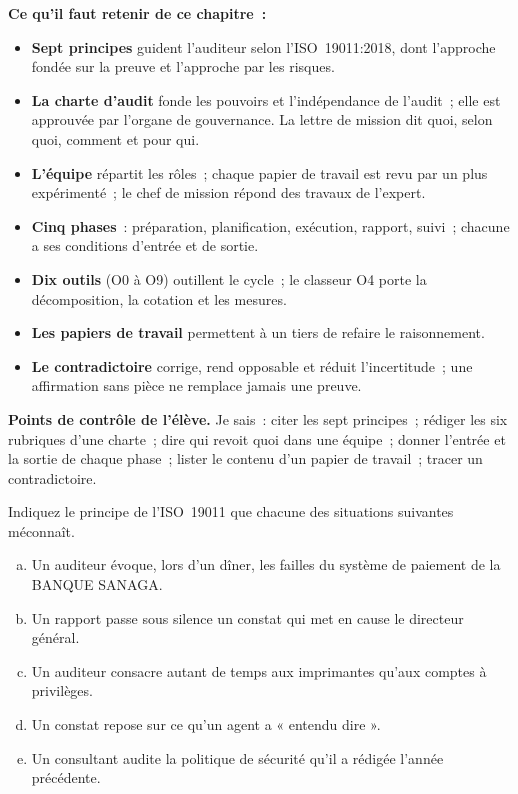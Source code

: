 \begin{boxresume}
\textbf{Ce qu'il faut retenir de ce chapitre~:}
\begin{itemize}
    \item \textbf{Sept principes} guident l'auditeur selon l'ISO~19011:2018,
          dont l'approche fondée sur la preuve et l'approche par les risques.
    \item \textbf{La charte d'audit} fonde les pouvoirs et l'indépendance de
          l'audit~; elle est approuvée par l'organe de gouvernance. La
          lettre de mission dit quoi, selon quoi, comment et pour qui.
    \item \textbf{L'équipe} répartit les rôles~; chaque papier de travail est
          revu par un plus expérimenté~; le chef de mission répond des
          travaux de l'expert.
    \item \textbf{Cinq phases}~: préparation, planification, exécution,
          rapport, suivi~; chacune a ses conditions d'entrée et de sortie.
    \item \textbf{Dix outils} (O0 à O9) outillent le cycle~; le classeur O4
          porte la décomposition, la cotation et les mesures.
    \item \textbf{Les papiers de travail} permettent à un tiers de refaire
          le raisonnement.
    \item \textbf{Le contradictoire} corrige, rend opposable et réduit
          l'incertitude~; une affirmation sans pièce ne remplace jamais une
          preuve.
\end{itemize}
\end{boxresume}

\begin{boxinfo}
\textbf{Points de contrôle de l'élève.} Je sais~: citer les sept
principes~; rédiger les six rubriques d'une charte~; dire qui revoit quoi
dans une équipe~; donner l'entrée et la sortie de chaque phase~; lister le
contenu d'un papier de travail~; tracer un contradictoire.
\end{boxinfo}

\bigskip

\begin{boxexo}[title={\ding{45}\quad Exercice~7.1. Quel principe~? \niveaubase}]
Indiquez le principe de l'ISO~19011 que chacune des situations suivantes
méconnaît.
\begin{enumerate}[(a)]
    \item Un auditeur évoque, lors d'un dîner, les failles du système de
          paiement de la BANQUE SANAGA.
    \item Un rapport passe sous silence un constat qui met en cause le
          directeur général.
    \item Un auditeur consacre autant de temps aux imprimantes qu'aux
          comptes à privilèges.
    \item Un constat repose sur ce qu'un agent a « entendu dire ».
    \item Un consultant audite la politique de sécurité qu'il a rédigée
          l'année précédente.
\end{enumerate}
\end{boxexo}

